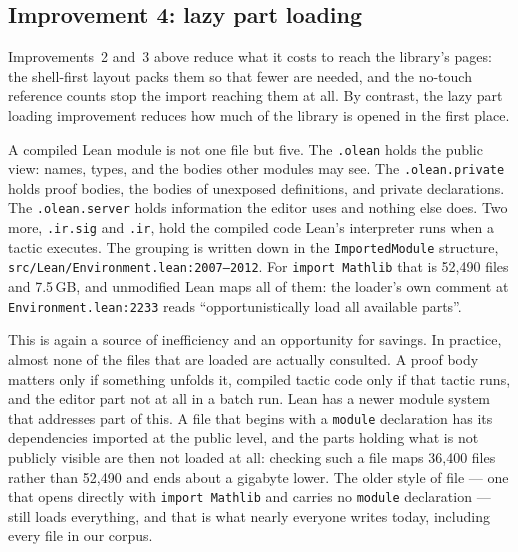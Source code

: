 \documentclass{article}
\newcommand{\Lean}{Lean\xspace}      %
\begin{document}
\subsection{Improvement 4: lazy part loading}
\label{sec:tn-4}

Improvements~2 and~3 above reduce what it costs to reach the library's pages: the shell-first layout packs them so that fewer are needed, and the no-touch reference counts stop the import reaching them at all. By contrast, the lazy part loading improvement reduces how much of the library is opened in the first place.

A compiled \Lean module is not one file but five. The \texttt{.olean} holds the public view: names, types, and the bodies other modules may see. The \texttt{.olean.private} holds proof bodies, the bodies of unexposed definitions, and private declarations. The \texttt{.olean.server} holds information the editor uses and nothing else does. Two more, \texttt{.ir.sig} and \texttt{.ir}, hold the compiled code \Lean's interpreter runs when a tactic executes. The grouping is written down in the \texttt{ImportedModule} structure, \texttt{src/Lean/Environment.lean:2007--2012}. For \texttt{import Mathlib} that is 52{,}490 files and 7.5\,GB, and unmodified \Lean maps all of them: the loader's own comment at \texttt{Environment.lean:2233} reads ``opportunistically load all available parts''.

This is again a source of inefficiency and an opportunity for savings. In practice, almost none of the files that are loaded are actually consulted. A proof body matters only if something unfolds it, compiled tactic code only if that tactic runs, and the editor part not at all in a batch run. \Lean has a newer module system that addresses part of this. A file that begins with a \texttt{module} declaration has its dependencies imported at the public level, and the parts holding what is not publicly visible are then not loaded at all: checking such a file maps 36{,}400 files rather than 52{,}490 and ends about a gigabyte lower. The older style of file --- one that opens directly with \texttt{import Mathlib} and carries no \texttt{module} declaration --- still loads everything, and that is what nearly everyone writes today, including every file in our corpus.
\end{document}
